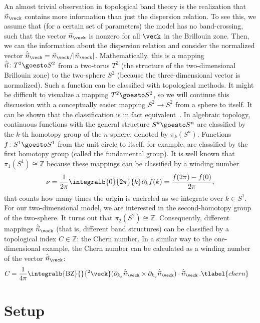 An almost trivial observation in topological band theory is the realization that $\vec{n}_\veck$ contains more information than just the dispersion relation.
To see this, we assume that (for a certain set of parameters) the model has no band-crossing, such that the vector $\vec{n}_\veck$ is nonzero for all $\veck$ in the Brillouin zone.
Then, we can  the information about the dispersion relation and consider the normalized vector $\hat{\vec{n}}_\veck = \vec{n}_\veck/|\vec{n}_\veck|$.
Mathematically, this is a mapping $\hat{\vec{n}}\colon T^2 \goesto S^2$ from a two-torus $T^2$ (the structure of the two-dimensional Brillouin zone) to the two-sphere $S^2$ (because the three-dimensional vector is normalized).
Such a function can be classified with topological methods.
It might be difficult to visualize a mapping $T^2 \goesto S^2$, so we will continue this discussion with a conceptually easier mapping $S^2 \to S^2$ from a sphere to itself.
It can be shown that the classification is in fact equivalent~\cite{Moore2011}.
In algebraic topology, continuous functions with the general structure $S^k \goesto S^n$ are classified by the $k$-th homotopy group of the $n$-sphere, denoted by $\pi_k(S^n)$.
Functions $f\colon S^1 \goesto S^1$ from the unit-circle to itself, for example, are classified by the first homotopy group (called the fundamental group).
It is well known that $\pi_1(S^1) \cong \mathds{Z}$ because these mappings can be classified by a winding number
\begin{align}
    \nu = \frac{1}{2\pi}\integralb{0}{2\pi}{k} \partial_k f(k) = \frac{f(2\pi)-f(0)}{2\pi},
\end{align}
that counts how many times the origin is encircled as we integrate over $k \in S^1$.
For our two-dimensional model, we are interested in the second-homotopy group of the two-sphere.
It turns out that $\pi_2(S^2) \cong \mathds{Z}$.
Consequently, different mappings $\hat{\vec{n}}_\veck$ (that is, different band structures) can be classified by a topological index $C \in \mathds{Z}$: the Chern number.
In a similar way to the one-dimensional example, the Chern number can be calculated as a winding number of the vector $\hat{\vec{n}}_\veck$:
\begin{align}
    C &= \frac{1}{4\pi}\integralb{\text{BZ}}{}{^2\veck} ( \partial_{k_x} \hat{\vec{n}}_{\veck} \times \partial_{k_y} \hat{\vec{n}}_{\veck} ) \cdot \hat{\vec{n}}_{\veck} \, . \tlabel{chern}
\end{align}


\section{Setup}

